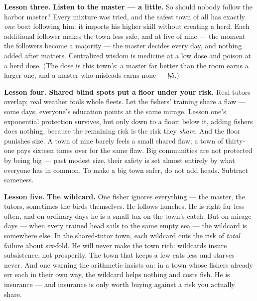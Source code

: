 \textbf{Lesson three. Listen to the master --- a little.} So should nobody
follow the harbor master? Every mixture was tried, and the safest town
of all has exactly \emph{one} boat following him: it imports his higher
skill without creating a herd. Each additional follower makes the
town less safe, and at five of nine --- the moment the followers become
a majority --- the master decides every day, and nothing added after
matters. Centralized wisdom is medicine at a low dose and poison at a
herd dose. (The dose is this town's: a master far better than the room
earns a larger one, and a master who misleads earns none --- §5.)

\textbf{Lesson four. Shared blind spots put a floor under your risk.}
Real tutors overlap; real weather fools whole fleets. Let the
fishers' training share a flaw --- some days, everyone's education
points at the same mirage. Lesson one's exponential protection
survives, but only down to a floor: below it, adding fishers does
nothing, because the remaining risk is the risk they \emph{share}. And the
floor punishes size. A town of nine barely feels a small shared flaw;
a town of thirty-one pays sixteen times over for the same flaw. Big
communities are not protected by being big --- past modest size, their
safety is set almost entirely by what everyone has in common. To make
a big town safer, do not add heads. Subtract sameness.

\textbf{Lesson five. The wildcard.} One fisher ignores everything --- the
master, the tutors, sometimes the birds themselves. He follows
hunches. He is right far less often, and on ordinary days he is a
small tax on the town's catch. But on mirage days --- when every
trained head sails to the same empty sea --- the wildcard is somewhere
else. In the shared-tutor town, each wildcard cuts the risk of
\emph{total} failure about six-fold. He will never make the town rich:
wildcards insure subsistence, not prosperity. The town that keeps a
few eats less and starves never. And one warning the arithmetic
insists on: in a town whose fishers already err each in their own
way, the wildcard helps nothing and costs fish. He is insurance ---
and insurance is only worth buying against a risk you actually share.

